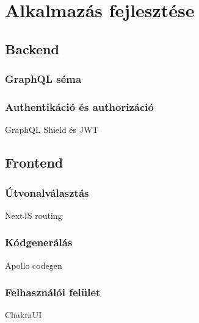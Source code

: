 
\chapter{Alkalmazás fejlesztése}

\section{Backend}


\subsection{GraphQL séma}


\subsection{Authentikáció és authorizáció}
GraphQL Shield és JWT

\section{Frontend}


\subsection{Útvonalválasztás}
NextJS routing

\subsection{Kódgenerálás}
Apollo codegen


\subsection{Felhasználói felület}
ChakraUI
